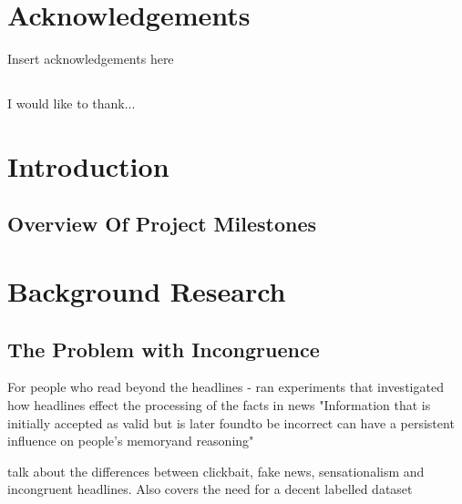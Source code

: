 \documentclass[12pt,a4paper]{article}
\begin{document}


\pagebreak

\pagebreak

\begin{abstract}
\end{abstract}
\pagebreak

\tableofcontents %
\newpage

\listoftables
\newpage

\listoffigures
\newpage

\section*{Acknowledgements}
Insert acknowledgements here
\subsection*{}
	I would like to thank...
\newpage


\section{Introduction}


\subsection{Overview Of Project Milestones}


\section{Background Research}
\subsection{The Problem with Incongruence}


For people who read beyond the headlines -  ran experiments that investigated how headlines effect the processing of the facts in news "Information that is initially accepted as valid but is later foundto be incorrect can have a persistent influence on people’s memoryand reasoning"

 talk about the differences between clickbait, fake news, sensationalism and incongruent headlines. Also covers the need for a decent labelled dataset
\end{document}
